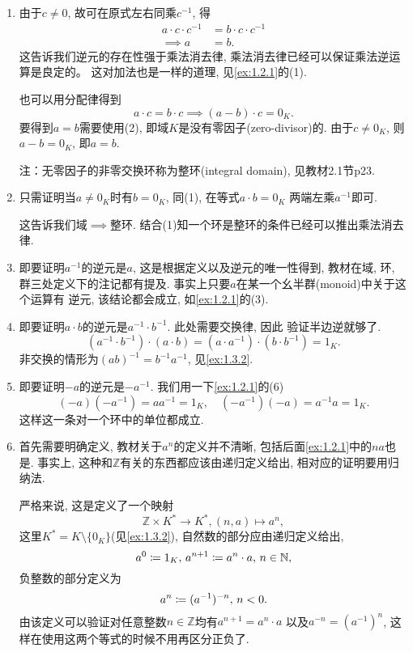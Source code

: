 \begin{solution}
    \begin{enumerate}[(1)]
        \item 由于$c \neq 0$, 故可在原式左右同乘$c^{-1}$, 得 
        \[ 
        \begin{aligned} 
            a \cdot c \cdot c^{-1} &= b \cdot c \cdot c^{-1}\\ 
            \implies a &= b.
        \end{aligned} 
        \]
        这告诉我们逆元的存在性强于乘法消去律, 乘法消去律已经可以保证乘法逆运算是良定的。
        这对加法也是一样的道理, 见\ref{ex:1.2.1}的(1).

        也可以用分配律得到
        \[
            a \cdot c = b \cdot c \implies (a - b) \cdot c = 0_K.
        \]
        要得到$a = b$需要使用(2), 即域$K$是没有零因子(zero-divisor)的. 由于$c \neq 0_K$,
    则$a - b = 0_K$, 即$a = b$.

        注：无零因子的非零交换环称为整环(integral domain), 见教材2.1节p23.
        \item 只需证明当$a \neq 0_K$时有$b = 0_K$, 同(1), 在等式$a \cdot b = 0_K$
    两端左乘$a^{-1}$即可.
        
        这告诉我们域$\implies$整环. 结合(1)知一个环是整环的条件已经可以推出乘法消去律.
        \item 即要证明$a^{-1}$的逆元是$a$, 这是根据定义以及逆元的唯一性得到, 教材在域, 
    环, 群三处定义下的注记都有提及. 事实上只要$a$在某一个幺半群(monoid)中关于这个运算有
    逆元, 该结论都会成立, 如\ref{ex:1.2.1}的(3).
        \item 即要证明$a \cdot b$的逆元是$a^{-1} \cdot b^{-1}$. 此处需要交换律, 因此
    验证半边逆就够了.
    \[
        (a^{-1} \cdot b^{-1}) \cdot (a \cdot b) = (a \cdot a^{-1}) \cdot (b \cdot b^{-1}) = 1_K.
    \]
    非交换的情形为$(ab)^{-1} = b^{-1}a^{-1}$, 见\ref{ex:1.3.2}.
        \item 即要证明$-a$的逆元是$-a^{-1}$. 我们用一下\ref{ex:1.2.1}的(6)
    \[
        (-a)(-a^{-1}) = aa^{-1} = 1_K, \quad (-a^{-1})(-a) = a^{-1}a = 1_K.
    \]
    这样这一条对一个环中的单位都成立.
        \item 首先需要明确定义, 教材关于$a^n$的定义并不清晰, 包括后面\ref{ex:1.2.1}中的$na$也是.
    事实上, 这种和$\mathbb{Z}$有关的东西都应该由递归定义给出, 相对应的证明要用归纳法.
        
        严格来说, 这是定义了一个映射
    \[
        \mathbb{Z} \times K^* \to K^*, (n, a) \mapsto a^n,
    \]
        这里$K^* = K \setminus \{0_K\}$(见\ref{ex:1.3.2}), 自然数的部分应由递归定义给出, 
    \[
        a^0 \mathrel{\coloneqq} 1_K,\, a^{n + 1} \mathrel{\coloneqq} a^n \cdot a,\, n \in \mathbb{N},
    \]
        负整数的部分定义为
    \[
        a^n \mathrel{\coloneqq} (a^{-1})^{-n},\, n < 0. 
    \]
    由该定义可以验证对任意整数$n \in \mathbb{Z}$均有$a^{n + 1} = a^n \cdot a$
    以及$a^{-n} = (a^{-1})^n$, 这样在使用这两个等式的时候不用再区分正负了.


\end{enumerate}
\end{solution}
